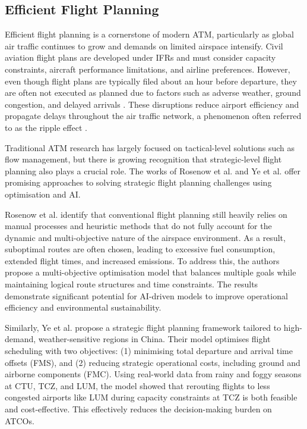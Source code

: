 \subsection{Efficient Flight Planning}

Efficient flight planning is a cornerstone of modern \gls{ATM}, particularly as global air traffic continues to grow and demands on limited airspace intensify.
Civil aviation flight plans are developed under \glspl{IFR} and must consider capacity constraints, aircraft performance limitations, and airline preferences.
However, even though flight plans are typically filed about an hour before departure, they are often not executed as planned due to factors such as adverse weather, ground congestion, and delayed arrivals  \cite{Rosenow_2021}.
These disruptions reduce airport efficiency and propagate delays throughout the air traffic network, a phenomenon often referred to as the ripple effect \cite{Ye_2024}.

Traditional \gls{ATM} research has largely focused on tactical-level solutions such as flow management, but there is growing recognition that strategic-level flight planning also plays a crucial role.
The works of Rosenow et al. \cite{Rosenow_2021} and Ye et al. \cite{Ye_2024} offer promising approaches to solving strategic flight planning challenges using optimisation and \gls{AI}.

Rosenow et al. \cite{Rosenow_2021} identify that conventional flight planning still heavily relies on manual processes and heuristic methods that do not fully account for the dynamic and multi-objective nature of the airspace environment.
As a result, suboptimal routes are often chosen, leading to excessive fuel consumption, extended flight times, and increased emissions.
To address this, the authors propose a multi-objective optimisation model that balances multiple goals while maintaining logical route structures and time constraints.
The results demonstrate significant potential for \gls{AI}-driven models to improve operational efficiency and environmental sustainability.

Similarly, Ye et al. \cite{Ye_2024} propose a strategic flight planning framework tailored to high-demand, weather-sensitive regions in China.
Their model optimises flight scheduling with two objectives: (1) minimising total departure and arrival time offsets (\gls{FMS}), and (2) reducing strategic operational costs, including ground and airborne components (\gls{FMC}).
Using real-world data from rainy and foggy seasons at \gls{CTU}, \gls{TCZ}, and \gls{LUM}, the model showed that rerouting flights to less congested airports like \gls{LUM} during capacity constraints at \gls{TCZ} is both feasible and cost-effective.
This effectively reduces the decision-making burden on \glspl{ATCO}.

